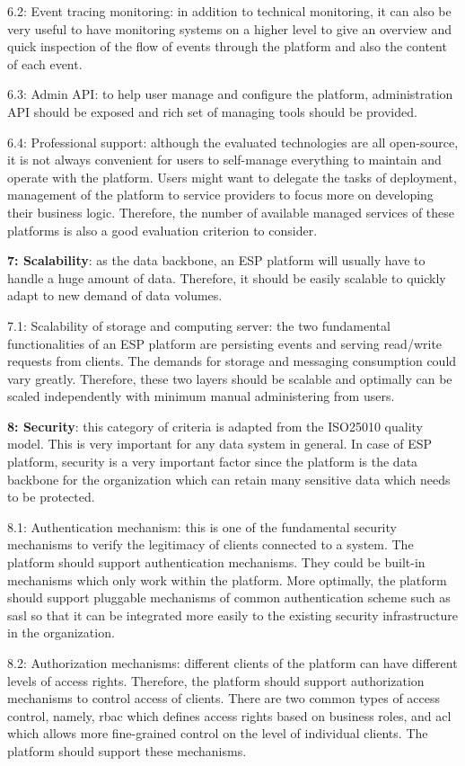 6.2: Event tracing monitoring: in addition to technical monitoring, it can also be very useful to have monitoring systems on a higher level to give an overview and quick inspection of the flow of events through the platform and also the content of each event.

6.3: Admin API: to help user manage and configure the platform, administration API should be exposed and rich set of managing tools should be provided. 

6.4: Professional support: although the evaluated technologies are all open-source, it is not always convenient for users to self-manage everything to maintain and operate with the platform. Users might want to delegate the tasks of deployment, management of the platform to service providers to focus more on developing their business logic. Therefore, the number of available managed services of these platforms is also a good evaluation criterion to consider.


\textbf{7: Scalability}: as the data backbone, an ESP platform will usually have to handle a huge amount of data. Therefore, it should be easily scalable to quickly adapt to new demand of data volumes.

7.1: Scalability of storage and computing server: the two fundamental functionalities of an ESP platform are persisting events and serving read/write requests from clients. The demands for storage and messaging consumption could vary greatly. Therefore, these two layers should be scalable and optimally can be scaled independently with minimum manual administering from users.

\textbf{8: Security}: this category of criteria is adapted from the ISO25010 quality model. This is very important for any data system in general. In case of ESP platform, security is a very important factor since the platform is the data backbone for the organization which can retain many sensitive data which needs to be protected.

8.1: Authentication mechanism: this is one of the fundamental security mechanisms to verify the legitimacy of clients connected to a system. The platform should support authentication mechanisms. They could be built-in mechanisms which only work within the platform. More optimally, the platform should support pluggable mechanisms of common authentication scheme such as \acrfull{sasl} so that it can be integrated more easily to the existing security infrastructure in the organization.

8.2: Authorization mechanisms: different clients of the platform can have different levels of access rights. Therefore, the platform should support authorization mechanisms to control access of clients. There are two common types of access control, namely, \acrfull{rbac} which defines access rights based on business roles, and \acrfull{acl} which allows more fine-grained control on the level of individual clients. The platform should support these mechanisms.

